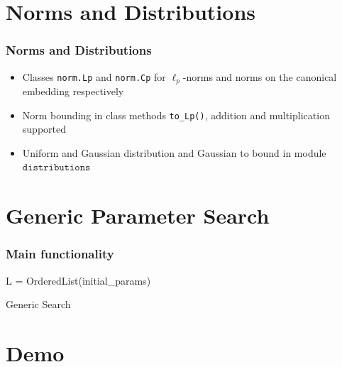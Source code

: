 \documentclass[t, aspectratio=169]{beamer}
\begin{document}
\section{Norms and Distributions}
\begin{frame}
    \frametitle{Norms and Distributions}
    \begin{itemize}[<+->]
        \item Classes \texttt{norm.Lp} and \texttt{norm.Cp} for $\ell_p$-norms and norms on the canonical embedding respectively
        \item Norm bounding in class methods \texttt{to\_Lp()}, addition and multiplication supported
        \item Uniform and Gaussian distribution and Gaussian to bound in module $\texttt{distributions}$
    \end{itemize}
\end{frame}


\section{Generic Parameter Search}
\begin{frame}
    \frametitle{Main functionality}
    \begin{algorithm2e}[H]
        \pause
        L = OrderedList(initial\_params)\\\pause
        \caption{Generic Search}
    \end{algorithm2e}
\end{frame}

\section{Demo}
\end{document}
